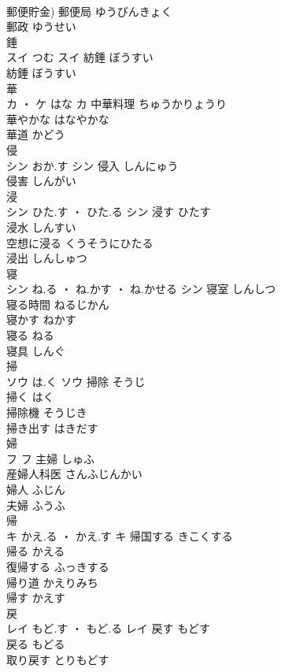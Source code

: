\documentclass[8pt]{extreport}
\begin{document}
\begin{CJK}{UTF8}{min}
\\	郵便貯金)	郵便局	ゆうびんきょく	
\\	郵政	ゆうせい	
\\	錘	
\\	スイ	つむ	スイ	紡錘	ぼうすい	
\\	紡錘	ぼうすい	
\\	華	
\\	カ ・ ケ	はな	カ	中華料理	ちゅうかりょうり	
\\	華やかな	はなやかな	
\\	華道	かどう	
\\	侵	
\\	シン	おか.す	シン	侵入	しんにゅう	
\\	侵害	しんがい	
\\	浸	
\\	シン	ひた.す ・ ひた.る	シン	浸す	ひたす	
\\	浸水	しんすい	
\\	空想に浸る	くうそうにひたる	
\\	浸出	しんしゅつ	
\\	寝	
\\	シン	ね.る ・ ね.かす ・ ね.かせる	シン	寝室	しんしつ	
\\	寝る時間	ねるじかん	
\\	寝かす	ねかす	
\\	寝る	ねる	
\\	寝具	しんぐ	
\\	掃	
\\	ソウ	は.く	ソウ	掃除	そうじ	
\\	掃く	はく	
\\	掃除機	そうじき	
\\	掃き出す	はきだす	
\\	婦	
\\	フ		フ	主婦	しゅふ	
\\	産婦人科医	さんふじんかい	
\\	婦人	ふじん	
\\	夫婦	ふうふ	
\\	帰	
\\	キ	かえ.る ・ かえ.す	キ	帰国する	きこくする	
\\	帰る	かえる	
\\	復帰する	ふっきする	
\\	帰り道	かえりみち	
\\	帰す	かえす	
\\	戻	
\\	レイ	もど.す ・ もど.る	レイ	戻す	もどす	
\\	戻る	もどる	
\\	取り戻す	とりもどす	

\end{CJK}
\end{document}
